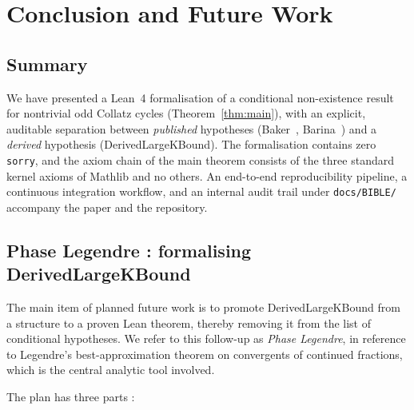 
\section{Conclusion and Future Work}
\label{sec:conclusion}

\subsection{Summary}

We have presented a Lean~4 formalisation of a conditional non-existence
result for nontrivial odd Collatz cycles (Theorem~\ref{thm:main}), with
an explicit, auditable separation between \emph{published} hypotheses
(Baker~\cite{Baker1966}, Barina~\cite{Barina2025}) and a \emph{derived}
hypothesis (\textsf{DerivedLargeKBound}). The formalisation contains zero
\texttt{sorry}, and the axiom chain of the main theorem consists of the
three standard kernel axioms of Mathlib and no others. An end-to-end
reproducibility pipeline, a continuous integration workflow, and an
internal audit trail under \texttt{docs/BIBLE/} accompany the paper and
the repository.

\subsection{Phase Legendre : formalising \textsf{DerivedLargeKBound}}


The main item of planned future work is to promote
\textsf{DerivedLargeKBound} from a structure to a proven Lean theorem,
thereby removing it from the list of conditional hypotheses. We refer to
this follow-up as \emph{Phase Legendre}, in reference to Legendre's
best-approximation theorem on convergents of continued fractions, which
is the central analytic tool involved.

The plan has three parts :

